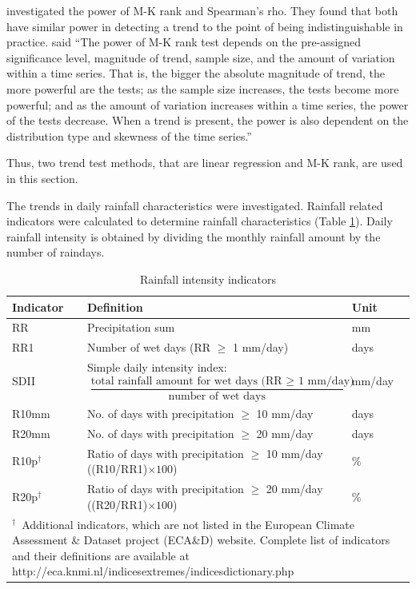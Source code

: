 \citet{yue2002-254} investigated the power of M-K rank and Spearman's rho. They
found that both have similar power in detecting a trend to the point of being
indistinguishable in practice. \citet{yue2002-254} said ``The power of M-K rank
test depends on the pre-assigned significance level, magnitude of trend, sample
size, and the amount of variation within a time series. That is, the bigger the
absolute magnitude of trend, the more powerful are the tests; as the sample size
increases, the tests become more powerful; and as the amount of variation
increases within a time series, the power of the tests decrease. When a trend is
present, the power is also dependent on the distribution type and skewness of
the time series.''

Thus, two trend test methods, that are linear regression and M-K rank, are used
in this section.

The trends in daily rainfall characteristics were investigated. Rainfall related
indicators were calculated to determine rainfall characteristics (Table
\ref{tab:RainfallIntensityIndicators}). Daily rainfall intensity is obtained by
dividing the monthly rainfall amount by the number of raindays.

\begin{table}[htbp]
  \centering
  \caption{Rainfall intensity indicators}
  \label{tab:RainfallIntensityIndicators}
  \footnotesize
    \begin{tabular}{l p{95mm} l}
    \toprule
    \textbf{Indicator} & \textbf{Definition} & \textbf{Unit}\\
    \midrule
    RR & Precipitation sum & mm\\
    RR1 & Number of wet days (RR $\geq$ 1 mm/day) & days\\
    SDII & Simple daily intensity index: \[\frac{\textrm{total
rainfall amount for wet days (RR $\geq$ 1 mm/day)}}{\textrm{number of wet days}}
\] & mm/day\\
    R10mm & No. of days with precipitation $\geq$ 10 mm/day & days\\
    R20mm & No. of days with precipitation $\geq$ 20 mm/day & days\\
    R10p$^\dagger$ & Ratio of days with precipitation $\geq$ 10
mm/day ((R10/RR1)$\times100$) & \%\\
    R20p$^\dagger$ & Ratio of days with precipitation $\geq$ 20
mm/day ((R20/RR1)$\times100$) & \%\\
    \bottomrule
    \multicolumn{3}{p{12cm}}{\footnotesize $^\dagger$\ Additional
indicators, which are not listed in the European Climate Assessment \& Dataset
project (ECA\&D) website. Complete list of indicators and their definitions are
available at http://eca.knmi.nl/indicesextremes/indicesdictionary.php}
    \end{tabular}
\end{table}


